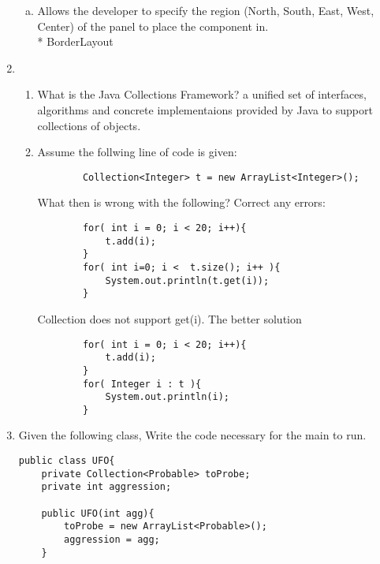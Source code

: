 \documentclass[11pt]{article}
\newenvironment{answer}{\large\lstset{basicstyle=\large}\color{white}}{}
\newenvironment{answer}{\large\lstset{basicstyle=\large}\color{red}}{}
\begin{document}
\begin{enumerate}
\begin{enumerate}[(a)]
\item Allows the developer to specify the region (North, South, East, West, Center) of the panel to place the component in.\\*
\begin{answer}
BorderLayout
\vspace{.5in}
\end{answer}

\end{enumerate}

\item 
    \begin{enumerate} 
    \item What is the Java Collections Framework?
    \begin{answer}
        a unified set of interfaces, algorithms and concrete implementaions 
    provided by Java to support collections of objects.
    \end{answer}
    \item Assume the follwing line of code is given:
    \begin{lstlisting}
        Collection<Integer> t = new ArrayList<Integer>();
    \end{lstlisting}
    What then is wrong with the following? Correct any errors:
    \begin{lstlisting}
        for( int i = 0; i < 20; i++){
            t.add(i);
        }
        for( int i=0; i <  t.size(); i++ ){
            System.out.println(t.get(i));
        }
    \end{lstlisting}
    \begin{answer}
    Collection does not support get(i). The better solution 
    \begin{lstlisting}
        for( int i = 0; i < 20; i++){
            t.add(i);
        }
        for( Integer i : t ){
            System.out.println(i);
        }

    \end{lstlisting}
    \end{answer}
    \end{enumerate}
    

\item Given the following class, Write the code necessary for the main to run.
\begin{lstlisting}
public class UFO{
    private Collection<Probable> toProbe;
    private int aggression;

    public UFO(int agg){
        toProbe = new ArrayList<Probable>();
        aggression = agg;
    }


\end{lstlisting}
\end{enumerate}
\end{document}

